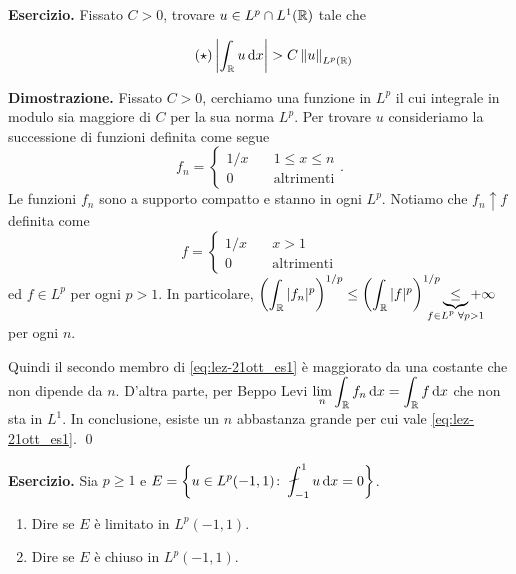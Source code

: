 \textbf{Esercizio.} Fissato $C > 0$, trovare $u \in L^p \cap L^1 (\mathbb R)$ tale che

\begin{equation} \tag{$\star$} \label{eq:lez-21ott_es1}
	\left| \int_{\mathbb R} u \,\mathrm{d} x\right| > C \left\lVert u \right\rVert_{L^p(\mathbb R)}
\end{equation}

\textbf{Dimostrazione.} Fissato $C > 0$, cerchiamo una funzione in $L^p$ il cui integrale in modulo sia maggiore di $C$ per la sua norma $L^p$.
Per trovare $u$ consideriamo la successione di funzioni definita come segue
%
$$
f_n = 
\begin{cases}
1/x \quad & 1 \leq x \leq n \\
0 \quad  & \text{altrimenti} 
\end{cases}. 
$$
%
Le funzioni $f_n$ sono a supporto compatto e stanno in ogni $L^p$.
Notiamo che $f_n \uparrow f$ definita come
%
$$
f = 
\begin{cases}
1/x \quad & x > 1 \\
0 \quad & \text{altrimenti}
\end{cases}
$$
%
ed $f \in L^p$ per ogni $p > 1$.
In particolare, $\ds \left( \int_\R |f_n|^p \right)^{1/p} \leq \left( \int_\R |f|^p \right)^{1/p} \underbrace{\leq}_{\mathclap{f \in L^p \; \forall p > 1}} +\infty$ per ogni $n$.

Quindi il secondo membro di \eqref{eq:lez-21ott_es1} è maggiorato da una costante che non dipende da $n$. D'altra parte, per Beppo Levi $\displaystyle \lim_n \int_{\mathbb R} f_n \,\mathrm{d} x = \int_{\mathbb R} f \,\mathrm{d} x$ che non sta in $L^1$. In conclusione, esiste un $n$ abbastanza grande per cui vale \eqref{eq:lez-21ott_es1}.
\qed

\textbf{Esercizio.} Sia $p \geq 1$ e $\ds E = \left\{ u \in L^p(-1,1) \colon \fint_{-1}^1 u \dd x = 0 \right\}$.

\begin{enumerate}
\item Dire se $E$ è limitato in $L^p(-1,1)$.

\item Dire se $E$ è chiuso in $L^p(-1,1)$.
\end{enumerate}

